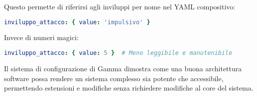 Questo permette di riferirsi agli inviluppi per nome nel YAML compositivo:
\begin{lstlisting}[language=Yaml]
inviluppo_attacco: { value: 'impulsivo' }
\end{lstlisting}

Invece di numeri magici:
\begin{lstlisting}[language=Yaml]
inviluppo_attacco: { value: 5 }  # Meno leggibile e manutenibile
\end{lstlisting}

Il sistema di configurazione di Gamma dimostra come una buona architettura software possa rendere un sistema complesso sia potente che accessibile, permettendo estensioni e modifiche senza richiedere modifiche al core del sistema.